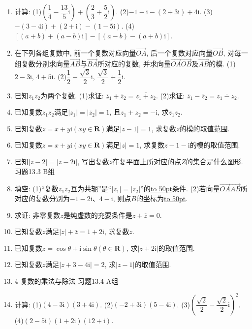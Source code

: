 \documentclass[10pt,a4paper]{article}
\newcommand{\blank}[1]{\underline{\hbox to #1pt{}}}
\begin{document}
\begin{enumerate}[1.]
\textcircled{2} 互为共轭的两个复数的和为实数, 而它们的差为纯虚数;
\textcircled{3} 若复数$z$的共轭复数是$-z$, 则$z$一定是纯虚数;
\textcircled{4} 若复数$z$的共轭复数是它自身, 则$z$一定是实数.
其中正确命题的序号是\blank{50}.
\item 计算:
(1)$(\dfrac 14-\dfrac{13}5\mathrm{i})+(\dfrac 23+\dfrac 52\mathrm{i})$.		(2)$-1-\mathrm{i}-(2+3\mathrm{i})+4\mathrm{i}$.
(3)$-(3-4\mathrm{i})+(2+\mathrm{i})-(1-5\mathrm{i})$.	(4)$[(a+b)+(a-b)\mathrm{i}]-[(a-b)-(a+b)\mathrm{i}]$.
\item 在下列各组复数中, 前一个复数对应向量$\overrightarrow{OA}$, 后一个复数对应向量$\overrightarrow{OB}$, 对每一组复数分别求向量$\overrightarrow{AB}$与$\overrightarrow{BA}$所对应的复数, 并求向量$\overrightarrow{OA}\overrightarrow{OB}$及$\overrightarrow{AB}$的模.
(1)$2-3\mathrm{i}$, $4+5\mathrm{i}$.						(2)$\dfrac 12-\dfrac{\sqrt 3}2\mathrm{i}$, $\dfrac{\sqrt 3}2+\dfrac 12\mathrm{i}$.
\item 已知$z_1z_2$为两个复数.
(1)求证: $\overline z_1+\overline z_2=\overline {z_1+z_2}$.
(2)求证: $\overline z_1-\overline z_2=\overline {z_1-z_2}$.
\item 已知复数$z_1z_2$满足$|z_1|=|\overline  z_2|=1$, 且$z_1+z_2=-\mathrm{i}$, 求$z_1z_2$.
\item 已知复数$z=x+y\mathrm{i}(xy\in \mathbf{R})$满足$|z-1|=1$, 求复数$z$的模的取值范围.
\item 已知复数$z=x+y\mathrm{i}(xy\in \mathbf{R})$满足$|z|=1$, 求复数$z-1-\mathrm{i}$的模的取值范围.
\item 已知$|z-2|=|z-2\mathrm{i}|$, 写出复数$z$在复平面上所对应的点$Z$的集合是什么图形.
习题13.3  B组
\item 填空:
(1)``复数$z_1z_2$互为共轭''是``$|z_1|=|z_2|$''的\blank{50}条件.
(2)若向量$\overrightarrow {OA}\overrightarrow {AB}$所对应的复数分别为$-1-2\mathrm{i}$、$4-\mathrm{i}$, 则点$B$的坐标为\blank{50}.
\item 求证: 非零复数$z$是纯虚数的充要条件是$z+\overline  z=0$.
\item 已知复数$z$满足$|z|+\overline z=1+2\mathrm{i}$, 求复数$z$.
\item 已知复数$z=\cos \theta +\mathrm{i}\sin \theta (\theta \in \mathbf{R})$, 求$|z+2\mathrm{i}|$的取值范围.
\item 已知复数$z$满足$|z+3-4\mathrm{i}|=2$, 求$|z-1|$的取值范围.
\item 4  复数的乘法与除法
习题13.4  A组
\item 计算:
(1)$(4-3\mathrm{i})(3+4\mathrm{i})$.						(2)$(-2+3\mathrm{i})(5-4\mathrm{i})$.
(3)$(\dfrac{\sqrt 2}2-\dfrac{\sqrt 2}2\mathrm{i})^2$.						(4)$(2-5\mathrm{i})(1+2\mathrm{i})(12+\mathrm{i})$.

\end{enumerate}
\end{document}
